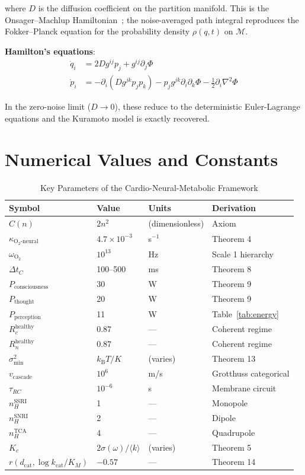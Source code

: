 \documentclass[10pt,twocolumn,a4paper]{article}
\theoremstyle{definition}
\newcommand{\kBT}{k_{\text{B}}T}
\newcommand{\calM}{\mathcal{M}}
\newcommand{\dcat}{d_{\text{cat}}}
\begin{document}
where $D$ is the diffusion coefficient on the partition manifold. This is
the Onsager--Machlup Hamiltonian~\cite{onsager1953fluctuations}; the noise-averaged path integral reproduces
the Fokker--Planck equation for the probability density $\rho(q,t)$ on $\calM$.

\textbf{Hamilton's equations}:
\begin{align}
\dot{q}_i &= 2D g^{ij} p_j + g^{ij}\partial_j\Phi\\
\dot{p}_i &= -\partial_i(D g^{jk} p_j p_k) - p_j g^{jk}\partial_i\partial_k\Phi - \frac{1}{2}\partial_i\nabla^2\Phi
\end{align}

In the zero-noise limit ($D \to 0$), these reduce to the deterministic Euler-Lagrange
equations and the Kuramoto model is exactly recovered.

\section{Numerical Values and Constants}
\label{app:constants}

\begin{table}[H]
\centering
\caption{Key Parameters of the Cardio-Neural-Metabolic Framework}
\begin{tabular}{llll}
\toprule
\textbf{Symbol} & \textbf{Value} & \textbf{Units} & \textbf{Derivation}\\
\midrule
$C(n)$ & $2n^2$ & (dimensionless) & Axiom\\
$\kappa_{\text{O}_2\text{-neural}}$ & $4.7 \times 10^{-3}$ & s$^{-1}$ & Theorem 4\\
$\omega_{\text{O}_2}$ & $10^{13}$ & Hz & Scale 1 hierarchy\\
$\Delta t_C$ & 100--500 & ms & Theorem 8\\
$P_{\text{consciousness}}$ & 30 & W & Theorem 9\\
$P_{\text{thought}}$ & 20 & W & Theorem 9\\
$P_{\text{perception}}$ & 11 & W & Table~\ref{tab:energy}\\
$R_c^{\text{healthy}}$ & 0.87 & — & Coherent regime\\
$R_n^{\text{healthy}}$ & 0.87 & — & Coherent regime\\
$\sigma^2_{\min}$ & $\kBT/K$ & (varies) & Theorem 13\\
$v_{\text{cascade}}$ & $10^6$ & m/s & Grotthuss categorical\\
$\tau_{RC}$ & $10^{-6}$ & s & Membrane circuit\\
$n_H^{\text{SSRI}}$ & 1 & — & Monopole\\
$n_H^{\text{SNRI}}$ & 2 & — & Dipole\\
$n_H^{\text{TCA}}$ & 4 & — & Quadrupole\\
$K_c$ & $2\sigma(\omega)/\langle k\rangle$ & (varies) & Theorem 5\\
$r(\dcat, \log k_{\text{cat}}/K_M)$ & $-0.57$ & — & Theorem 14\\
\bottomrule
\end{tabular}
\end{table}



\end{document}
